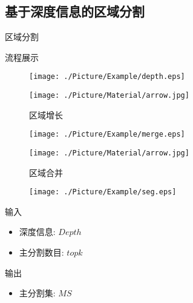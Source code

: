 \documentclass[xcolor=table,compress,blue]{beamer}
\begin{document}
  \subsection{基于深度信息的区域分割}
	\begin{frame}{区域分割}
		\begin{exampleblock}{流程展示}
			\begin{figure}[htpb]
				\centering
				\begin{minipage}[b]{0.8in}
					\centerline{ \texttt{[image: ./Picture/Example/depth.eps]} }
				\end{minipage}
				\begin{minipage}[b]{0.8in}
					\centerline{ \texttt{[image: ./Picture/Material/arrow.jpg]} }
					\centerline{\tiny{区域增长}}
				\end{minipage}
				\begin{minipage}[b]{0.8in}
					\centerline{ \texttt{[image: ./Picture/Example/merge.eps]} }
				\end{minipage}
				\begin{minipage}[b]{0.8in}
					\centerline{ \texttt{[image: ./Picture/Material/arrow.jpg]} }
					\centerline{\tiny{区域合并}}
				\end{minipage}
				\begin{minipage}[b]{0.8in}
					\centerline{ \texttt{[image: ./Picture/Example/seg.eps]} }
				\end{minipage}
			\end{figure}
		\end{exampleblock}
		\begin{exampleblock}{输入}
			\begin{itemize}		
				\item  深度信息: $Depth$
				\item  主分割数目: ${topk}$
			\end{itemize}
		\end{exampleblock}
		\begin{exampleblock}{输出}
			\begin{itemize}		
				\item  主分割集: ${MS}$
			\end{itemize}
		\end{exampleblock}
	\end{frame}
	
\end{document}

